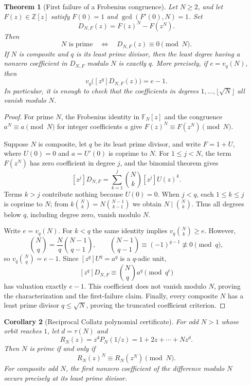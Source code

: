 \documentclass[11pt,a4paper]{article}
\newtheorem{theorem}{Theorem}[section]
\newtheorem{corollary}[theorem]{Corollary}
\theoremstyle{definition}
\theoremstyle{remark}
\numberwithin{equation}{section}
\begin{document}
\begin{theorem}[First failure of a Frobenius congruence]
Let $N\geq2$, and let $F(z)\in\mathbb Z[z]$ satisfy
$F(0)=1$ and $\gcd(F'(0),N)=1$.  Set
\[
 D_{N,F}(z)=F(z)^N-F(z^N).
\]
Then
\[
 N\text{ is prime}\quad\Longleftrightarrow\quad
 D_{N,F}(z)\equiv0\pmod N.
\]
If $N$ is composite and $q$ is its least prime divisor, then the least
degree having a nonzero coefficient in $D_{N,F}$ modulo $N$ is exactly $q$.
More precisely, if $e=v_q(N)$, then
\[
 v_q\bigl([z^q]D_{N,F}(z)\bigr)=e-1.
\]
In particular, it is enough to check that the coefficients in degrees
$1,\ldots,\lfloor\sqrt N\rfloor$ all vanish modulo $N$.
\end{theorem}

\begin{proof}
For prime $N$, the Frobenius identity in $\mathbb F_N[z]$ and the congruence
$a^N\equiv a\pmod N$ for integer coefficients $a$ give
$F(z)^N\equiv F(z^N)\pmod N$.

Suppose $N$ is composite, let $q$ be its least prime divisor, and write
$F=1+U$, where $U(0)=0$ and $a=U'(0)$ is coprime to $N$.  For $1\leq j<N$,
the term $F(z^N)$ has zero coefficient in degree $j$, and the binomial
theorem gives
\[
 [z^j]D_{N,F}
 =\sum_{k=1}^{j}\binom Nk[z^j]U(z)^k.
\]
Terms $k>j$ contribute nothing because $U(0)=0$.
When $j<q$, each $1\leq k\leq j$ is coprime to $N$; from
$k\binom Nk=N\binom{N-1}{k-1}$ we obtain $N\mid\binom Nk$.
Thus all degrees below $q$, including degree zero, vanish modulo $N$.

Write $e=v_q(N)$.  For $k<q$ the same identity implies
$v_q\binom Nk\geq e$.  However,
\[
 \binom Nq=\frac Nq\binom{N-1}{q-1},\qquad
 \binom{N-1}{q-1}\equiv(-1)^{q-1}\not\equiv0\pmod q,
\]
so $v_q\binom Nq=e-1$.  Since $[z^q]U^q=a^q$ is a $q$-adic unit,
\[
 [z^q]D_{N,F}\equiv\binom Nq a^q\pmod {q^e}
\]
has valuation exactly $e-1$.  This coefficient does not vanish modulo $N$,
proving the characterization and the first-failure claim.  Finally, every
composite $N$ has a least prime divisor $q\leq\sqrt N$, proving the
truncated coefficient criterion.
\end{proof}

\begin{corollary}[Reciprocal Collatz polynomial certificate]
For odd $N>1$ whose orbit reaches $1$, let $d=\tau(N)$ and
\[
 R_N(z)=z^dP_N(1/z)=1+2z+\cdots+Nz^d.
\]
Then $N$ is prime if and only if
\[
 R_N(z)^N\equiv R_N(z^N)\pmod N.
\]
For composite odd $N$, the first nonzero coefficient of the difference
modulo $N$ occurs precisely at its least prime divisor.
\end{corollary}
\end{document}
